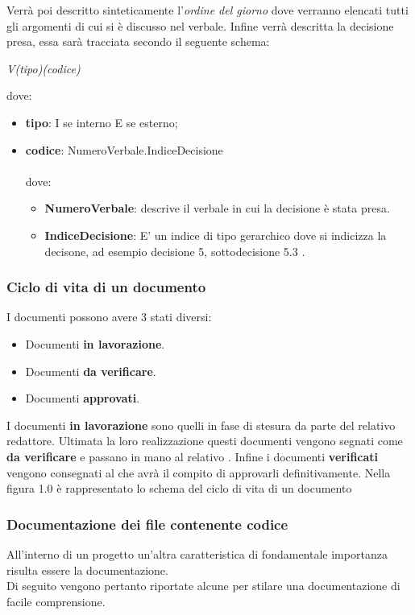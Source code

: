 Verrà poi descritto sinteticamente l'\textit{ordine del giorno} dove verranno elencati tutti gli argomenti di cui si è discusso nel verbale.
Infine verrà descritta la decisione presa, essa sarà tracciata secondo il seguente schema: 
\begin{center}
\textit{V(tipo)(codice)}
\end{center}
dove:
\begin{itemize}
\item \textbf{tipo}: I se interno E se esterno;
\item \textbf{codice}: NumeroVerbale.IndiceDecisione \\ \\ dove:
\begin{itemize}
\item \textbf{NumeroVerbale}: descrive il verbale in cui la decisione è stata presa.
\item \textbf{IndiceDecisione}: E' un indice di tipo gerarchico dove si indicizza la decisone, ad esempio decisione 5, sottodecisione 5.3 .
\end{itemize}
\end{itemize}

\subsubsection{Ciclo di vita di un documento}
 I documenti possono avere 3 stati diversi:
\begin{itemize}
  \item Documenti \textbf{in lavorazione}.
  \item Documenti \textbf{da verificare}.
  \item Documenti \textbf{approvati}.
\end{itemize}
I documenti \textbf{in lavorazione} sono quelli in fase di stesura da parte del relativo redattore. Ultimata la loro realizzazione questi documenti vengono segnati come \textbf{da verificare} e passano in mano al relativo \Ver. Infine i documenti \textbf{verificati} vengono consegnati al \Pm che avrà il compito di approvarli definitivamente. Nella figura 1.0 è rappresentato lo schema del ciclo di vita di un documento

\subsubsection{Documentazione dei file contenente codice}
All'interno di un progetto  un'altra caratteristica di fondamentale importanza risulta essere la documentazione. \\
Di seguito vengono pertanto riportate alcune  per stilare una documentazione di facile comprensione.

